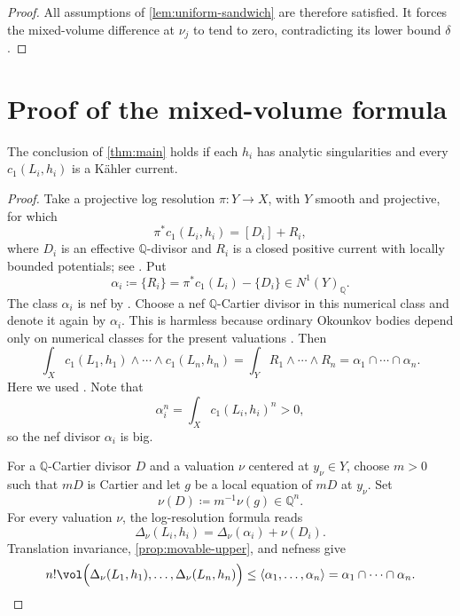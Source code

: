 \documentclass[11pt,a4paper]{amsart}
\begin{document}
\begin{proof}
All assumptions of \cref{lem:uniform-sandwich} are therefore satisfied.  It forces the mixed-volume difference at $\nu_j$ to tend to zero, contradicting its lower bound $\delta$.
\end{proof}

\section{Proof of the mixed-volume formula}

\begin{proposition}\label{prop:analytic-case}
The conclusion of \cref{thm:main} holds if each $h_i$ has analytic singularities and every $c_1(L_i,h_i)$ is a K\"ahler current.
\end{proposition}

\begin{proof}
Take a projective log resolution $\pi\colon Y\to X$, with $Y$ smooth and projective, for which
\[
 \pi^*c_1(L_i,h_i)=[D_i]+R_i,
\]
where $D_i$ is an effective $\mathbb Q$-divisor and $R_i$ is a closed positive current with locally bounded potentials; see
\cite[Definition~1.6.2 and Theorem~1.6.1]{Xiabook}.  Put
\[
 \alpha_i\coloneqq\{R_i\}
 =\pi^*c_1(L_i)-\{D_i\}\in N^1(Y)_{\mathbb Q}.
\]
The class $\alpha_i$ is nef by \cite[Lemma~1.6.1]{Xiabook}.  Choose a
nef $\mathbb Q$-Cartier divisor in this numerical class and denote it again
by $\alpha_i$.  This is harmless because ordinary Okounkov bodies depend
only on numerical classes for the present valuations
\cite[Proposition~10.3.2]{Xiabook}.  Then
\begin{equation}\label{eq:mass-on-resolution}
 \int_Xc_1(L_1,h_1)\wedge\cdots\wedge c_1(L_n,h_n)=\int_Y R_1\wedge\cdots\wedge R_n=\alpha_1\cap \cdots \cap \alpha_n.
\end{equation}
Here we used \cite[Proposition~2.4.2 and Proposition~2.2.1(1), (3), and (4)]{Xiabook}. Note that
\[
 \alpha_i^n=\int_X c_1(L_i,h_i)^n>0,
\]
so the nef divisor $\alpha_i$ is big.

For a $\mathbb Q$-Cartier divisor $D$ and a valuation $\nu$ centered at $y_\nu\in Y$, choose $m>0$ such that $mD$ is Cartier and let $g$ be a local equation of $mD$ at $y_\nu$. Set
\[
 \nu(D)\coloneqq m^{-1}\nu(g)\in\mathbb Q^n.
\]
For every valuation $\nu$, the log-resolution formula \cite[Remark~10.3.1, Equation~(10.22)]{Xiabook} reads
\begin{equation}\label{eq:resolution-body}
 \Delta_\nu(L_i,h_i)=\Delta_\nu(\alpha_i)+\nu(D_i).
\end{equation}
Translation invariance, \cref{prop:movable-upper}, and nefness give
\begin{equation}\label{eq:analytic-upper}
 n!\vol\Bigl(\Delta_\nu(L_1,h_1),\ldots,\Delta_\nu(L_n,h_n)\Bigr) \leq\langle \alpha_1,\ldots,\alpha_n\rangle=\alpha_1\cap \cdots \cap \alpha_n.
\end{equation}


\end{proof}
\end{document}
